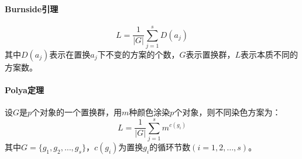 \paragraph{Burnside引理}
\[ L=\frac{1}{|G|} \sum_{j=1}^s D(a_j) \]
其中$D(a_j)$表示在置换$a_j$下不变的方案的个数，$G$表示置换群，$L$表示本质不同的方案数。

\paragraph{Polya定理}
设$G$是$p$个对象的一个置换群，用$m$种颜色涂染$p$个对象，则不同染色方案为：
\[ L=\frac{1}{|G|} \sum_{j=1}^s m^{c(g_i)} \]
其中$G=\{g_1, g_2, \dots, g_s \}$，$c(g_i)$为置换$g_i$的循环节数$(i=1, 2, \dots, s)$。


